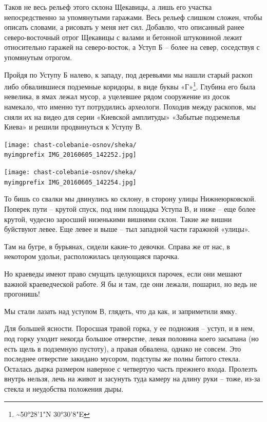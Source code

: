 Таков не весь рельеф этого склона Щекавицы, а лишь его участка непосредственно за упомянутыми гаражами. Весь рельеф слишком сложен, чтобы описать словами, а рисовать у меня нет сил. Добавлю, что описанный ранее северо-восточный отрог Щекавицы с валами и бетонной штуковиной лежит относительно гаражей на северо-восток, а Уступ Б – более на север, соседствуя с упомянутым отрогом.

Пройдя по Уступу Б налево, к западу, под деревьями мы нашли старый раскоп либо обвалившиеся подземные коридоры, в виде буквы «Г»\footnote{\textasciitilde{}50°28'1"N 30°30'8"E}. Глубина его была невелика, в ямах лежал мусор, а уцелевшее рядом сооружение из досок намекало, что именно тут потрудились археологи. Походив между раскопов, мы сняли их на видео для серии «Киевской амплитуды» «Забытые подземелья Киева» и решили продвинуться к Уступу В. 

\begin{center}
\texttt{[image: chast-colebanie-osnov/sheka/\\myimgprefix IMG\_20160605\_142252.jpg]}
\end{center}

\begin{center}
\texttt{[image: chast-colebanie-osnov/sheka/\\myimgprefix IMG\_20160605\_142254.jpg]}
\end{center}

\newpage

То бишь со свалки мы двинулись ко склону, в сторону улицы Нижнеюрковской. Поперек пути – крутой спуск, под ним площадка Уступа В, и ниже – еще более крутой, чудесно заросший низенькими вишнями склон. Такие же вишни буйствуют левее. Еще левее и выше – тыл западной части гаражной «улицы».

Там на бугре, в бурьянах, сидели какие-то девочки. Справа же от нас, в некотором удольи, расположилась целующаяся парочка.

Но краеведы имеют право смущать целующихся парочек, если они мешают важной краеведческой работе. Я бы и там, где они лежали, пошарил, но ведь не прогонишь!
 
Мы стали лазать над уступом В, глядеть, что да как, и заприметили ямку.

Для большей ясности. Поросшая травой горка, у ее подножия – уступ, и в нем, под горку уходит некогда большое отверстие, левая половина коего засыпана (но есть щель в подземную пустоту), а правая обвалена, однако не совсем. Это последнее отверстие закидано мусором, подступы же полны битого стекла. Осталась дырка размером наверное с четвертую часть прежнего входа. Пролезть внутрь нельзя, лечь на живот и засунуть туда камеру на длину руки – тоже, из-за стекла и неудобства положения дыры.

